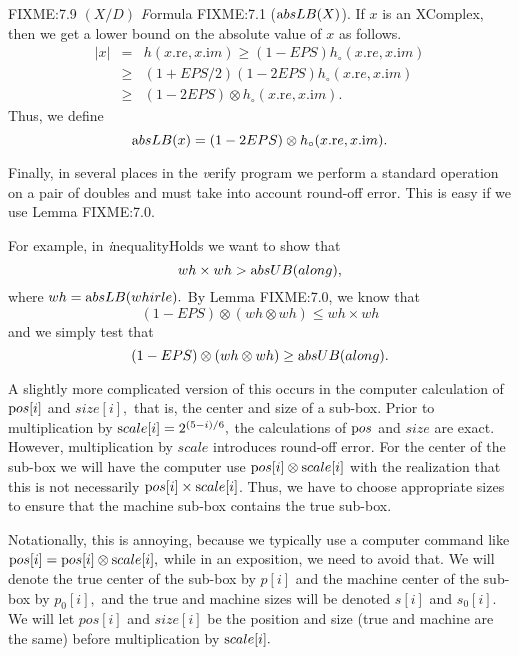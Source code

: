 \begin{definition}
\begin{proposition}{FIXME:7.9 $(X / D)$}
{\textit Formula} FIXME:7.1 (${\textrm absLB}(X)$).
If $x$ is an XComplex, then
we get a lower bound on the absolute value of $x$ as follows.
\begin{eqnarray*}
|x|& =& h(x.{\mathrm re},x.{\mathrm im}) \ge (1 - EPS) h_{\circ} (x.{\mathrm re},x.{\mathrm im})\\
&\ge& (1 + EPS/2) (1 - 2EPS) h_{\circ} (x.{\mathrm
re},x.{\mathrm im})\\
&\ge& (1 - 2EPS) \otimes h_{\circ} (x.{\mathrm re},x.{\mathrm im}).
\end{eqnarray*}
Thus, we define 
$${\textrm absLB}(x) = (1 - 2EPS) \otimes h_{\circ} (x.{\mathrm re},x.{\mathrm im}).$$ 

Finally, in several places in the {\textit verify} program we perform a standard operation on a pair of doubles and must take into account round-off error.  This is easy if we use Lemma FIXME:7.0.

For example, in {\textit inequalityHolds} we want to show that $$wh \times wh  > {\textrm absUB}{\textrm (along),}$$ where $wh =
{\textrm absLB}{\textrm (whirle)}.$   
By Lemma FIXME:7.0, we know that $$(1 - EPS) \otimes (wh \otimes wh) \le wh \times wh$$ and we simply test that 
$$(1 - EPS) \otimes  (wh \otimes wh) \ge {\textrm absUB}{\textrm (along)}.$$

A slightly more complicated version of this occurs in the computer calculation of ${\textrm pos}[i]$ and $size[i],$ that is, the center and size of a sub-box.  Prior to multiplication by ${\textrm scale}[i] = 2 ^{(5 - i)/6},$  the calculations of ${\textrm pos}$ and $size$ are exact.  However, multiplication by $scale$ introduces round-off error.  For the center of the sub-box we will have the computer use ${\textrm pos}[i] \otimes {\textrm scale}[i]$ with the realization that this is not necessarily ${\textrm pos}[i] \times {\textrm scale}[i]$.   Thus, we have to choose appropriate sizes to ensure that the machine sub-box contains the true sub-box.  

Notationally, this is annoying, because we typically use a computer command like ${\textrm pos}[i] = {\textrm pos}[i] \otimes {\textrm scale}[i],$ while in an exposition, we need to avoid that.  We will denote the true center of the sub-box by $p[i]$ and the machine center of the sub-box by $p_0[i],$ and the true and machine sizes will be denoted $s[i]$ and $s_0[i].$  We will let $pos[i]$ and $size[i]$ be the position and size (true and machine are the same) before multiplication by ${\textrm scale}[i].$


\end{proposition}
\end{definition}
